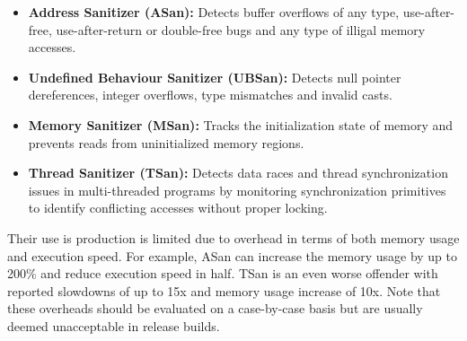 \begin{itemize}
    \item \textbf{Address Sanitizer (ASan):} Detects buffer overflows of any
          type, use-after-free, use-after-return or double-free bugs and any
          type of illigal memory accesses.
    \item \textbf{Undefined Behaviour Sanitizer (UBSan):} Detects null pointer
          dereferences, integer overflows, type mismatches and invalid casts.
    \item \textbf{Memory Sanitizer (MSan):} Tracks the initialization state of
          memory and prevents reads from uninitialized memory regions.
    \item \textbf{Thread Sanitizer (TSan):} Detects data races and thread
          synchronization issues in multi-threaded programs by monitoring
          synchronization primitives to identify conflicting accesses without
          proper locking.
\end{itemize}

Their use is production is limited due to overhead in terms of both memory usage
and execution speed. For example, ASan can increase the memory usage by up to
200\% and reduce execution speed in half. TSan is an even worse offender with
reported slowdowns of up to 15x and memory usage increase of 10x. Note that
these overheads should be evaluated on a case-by-case basis but are usually
deemed unacceptable in release builds.

